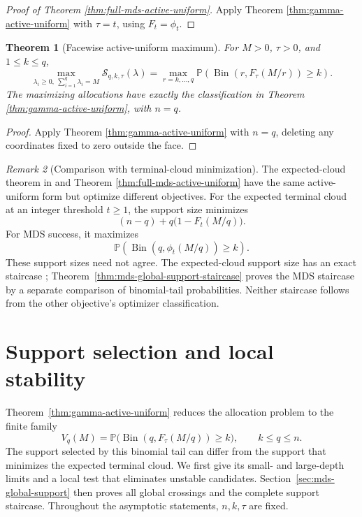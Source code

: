 \documentclass[11pt]{article}
\newtheorem{theorem}{Theorem}[section]
\theoremstyle{definition}
\theoremstyle{remark}
\newtheorem{remark}[theorem]{Remark}
\DeclareMathOperator{\Bin}{Bin}
\newcommand{\Pbb}{\mathbb P}
\newcommand{\1}{\mathbf 1}
\begin{document}
\begin{proof}[Proof of Theorem \ref{thm:full-mds-active-uniform}]
Apply Theorem \ref{thm:gamma-active-uniform} with \(\tau=t\), using \(F_t=\phi_t\).
\end{proof}

\begin{theorem}[Facewise active-uniform maximum]
\label{thm:facewise-active-uniform-maximum}
For \(M>0\), \(\tau>0\), and \(1\le k\le q\),
\[
  \max_{\lambda_i\ge0,\ \sum_{i=1}^q\lambda_i=M}
       \mathcal S_{q,k,\tau}(\lambda)
  =\max_{r=k,\ldots,q}
       \Pbb\left(\Bin(r,F_\tau(M/r))\ge k\right).
\]
The maximizing allocations have exactly the classification in Theorem \ref{thm:gamma-active-uniform}, with \(n=q\).
\end{theorem}

\begin{proof}
Apply Theorem \ref{thm:gamma-active-uniform} with \(n=q\), deleting any coordinates fixed to zero outside the face.
\end{proof}

\begin{remark}[Comparison with terminal-cloud minimization]
The expected-cloud theorem in \cite{LongCloud2026} and Theorem \ref{thm:full-mds-active-uniform} have the same active-uniform form but optimize different objectives.  For the expected terminal cloud at an integer threshold \(t\ge1\), the support size minimizes
\[
  (n-q)+q\bigl(1-F_t(M/q)\bigr).
\]
For MDS success, it maximizes
\[
  \Pbb\left(\Bin(q,\phi_t(M/q))\ge k\right).
\]
These support sizes need not agree. The expected-cloud support size
has an exact staircase \cite{LongCloud2026};
Theorem~\ref{thm:mds-global-support-staircase} proves the MDS staircase
by a separate comparison of binomial-tail probabilities. Neither
staircase follows from the other objective's optimizer classification.
\end{remark}

\section{Support selection and local stability}
\label{sec:mds-support}

Theorem~\ref{thm:gamma-active-uniform} reduces the allocation problem to
the finite family
\begin{equation}\label{eq:mds-support-values}
  V_q(M)=\Pbb\bigl(\Bin(q,F_\tau(M/q))\ge k\bigr),
  \qquad k\le q\le n.
\end{equation}
The support selected by this binomial tail can differ from the support
that minimizes the expected terminal cloud. We first give its small-
and large-depth limits and a local test that eliminates unstable
candidates. Section~\ref{sec:mds-global-support} then proves all global
crossings and the complete support staircase.
Throughout the asymptotic statements, \(n,k,\tau\) are fixed.
\end{document}
